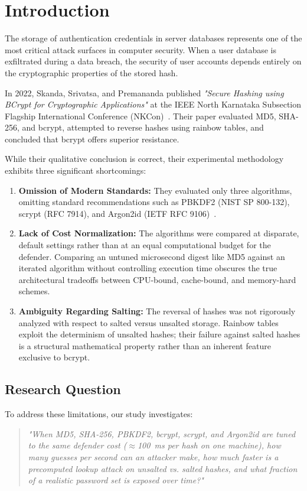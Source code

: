 \documentclass[conference]{IEEEtran}
\begin{document}
\section{Introduction}
The storage of authentication credentials in server databases represents one of the most critical attack surfaces in computer security. When a user database is exfiltrated during a data breach, the security of user accounts depends entirely on the cryptographic properties of the stored hash.

In 2022, Skanda, Srivatsa, and Premananda published \textit{"Secure Hashing using BCrypt for Cryptographic Applications"} at the IEEE North Karnataka Subsection Flagship International Conference (NKCon)~\cite{skanda2022}. Their paper evaluated MD5, SHA-256, and bcrypt, attempted to reverse hashes using rainbow tables, and concluded that bcrypt offers superior resistance.

While their qualitative conclusion is correct, their experimental methodology exhibits three significant shortcomings:
\begin{enumerate}
    \item \textbf{Omission of Modern Standards:} They evaluated only three algorithms, omitting standard recommendations such as PBKDF2 (NIST SP 800-132), scrypt (RFC 7914), and Argon2id (IETF RFC 9106)~\cite{rfc9106}.
    \item \textbf{Lack of Cost Normalization:} The algorithms were compared at disparate, default settings rather than at an equal computational budget for the defender. Comparing an untuned microsecond digest like MD5 against an iterated algorithm without controlling execution time obscures the true architectural tradeoffs between CPU-bound, cache-bound, and memory-hard schemes.
    \item \textbf{Ambiguity Regarding Salting:} The reversal of hashes was not rigorously analyzed with respect to salted versus unsalted storage. Rainbow tables exploit the determinism of unsalted hashes; their failure against salted hashes is a structural mathematical property rather than an inherent feature exclusive to bcrypt.
\end{enumerate}

\subsection{Research Question}
To address these limitations, our study investigates:
\begin{quote}
\textit{"When MD5, SHA-256, PBKDF2, bcrypt, scrypt, and Argon2id are tuned to the same defender cost ($\approx$100~ms per hash on one machine), how many guesses per second can an attacker make, how much faster is a precomputed lookup attack on unsalted vs. salted hashes, and what fraction of a realistic password set is exposed over time?"}
\end{quote}
\end{document}
